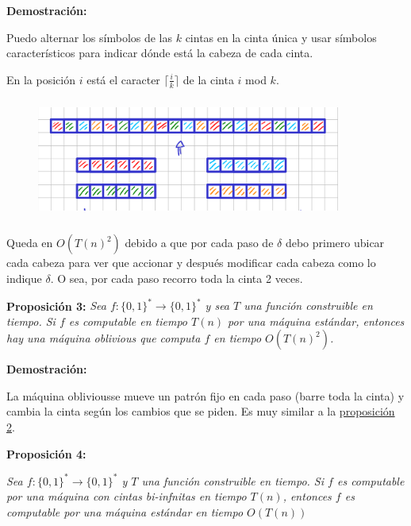 \documentclass{article}
\begin{document}
\begin{flushleft}
  \textbf{\textcolor{Mulberry}{Demostración:}}

  Puedo alternar los símbolos de las $k$ cintas en la cinta única y usar símbolos característicos
  para indicar dónde está la cabeza de cada cinta.

  En la posición $i$ está el caracter $\lceil \frac{i}{k} \rceil$ de la cinta $i$ mod $k$.

  \begin{figure}[h] 
    \centering 
    \includegraphics[width=10cm, height=4cm]{./imagenes/4_cintas_a_1.png}
  \end{figure}

  Queda en $O(T(n)^2)$ debido a que por cada paso de $\delta$ debo primero ubicar cada cabeza para 
  ver que accionar y después modificar cada cabeza como lo indique $\delta$. O sea, por cada paso 
  recorro toda la cinta 2 veces.
\end{flushleft}

\begin{flushleft}
  \textbf{Proposición 3:}
  \textit{Sea $f : \{0,1\}^* \rightarrow \{0,1\}^*$ y sea $T$ una función construible en tiempo. Si $f$
  es computable en tiempo $T(n)$ por una máquina estándar, entonces hay una máquina oblivious que 
  computa $f$ en tiempo $O(T(n)^2)$.}
\end{flushleft}

\begin{flushleft}
  \textbf{\textcolor{Mulberry}{Demostración:}}

  La máquina obliviousse mueve un patrón fijo en cada paso (barre toda la cinta) y cambia la cinta según 
  los cambios que se piden. Es muy similar a la \hyperlink{prop2}{\textcolor{Rhodamine}{proposición 2}}.
\end{flushleft}

\begin{flushleft}
  \textbf{Proposición 4:}

  \textit{Sea $f : \{0,1\}^* \rightarrow \{0,1\}^*$ y $T$ una función construible en tiempo. Si $f$
  es computable por una máquina con cintas bi-infnitas en tiempo $T(n)$, entonces $f$ es computable
  por una máquina estándar en tiempo $O(T(n))$}
\end{flushleft}
\end{document}
